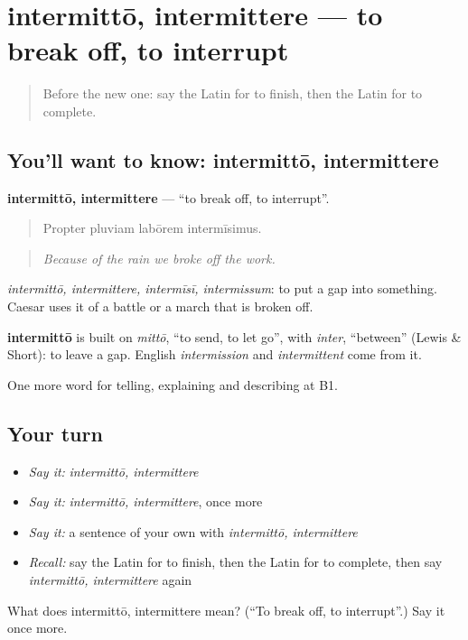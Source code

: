 \section[intermittō, intermittere]{intermittō, intermittere — to break off, to interrupt}

\label{lesson:LA-C297-intermitto}



\begin{quote}
Before the new one: say the Latin for to finish, then the Latin for to complete.
\end{quote}

\subsection*{You'll want to know: intermittō, intermittere}
\textbf{intermittō, intermittere} — \textquotedblleft{}to break off, to interrupt\textquotedblright{}.

\begin{quote}
Propter pluviam labōrem intermīsimus.
\end{quote}

\begin{quote}
\emph{Because of the rain we broke off the work.}
\end{quote}

\emph{intermittō, intermittere, intermīsī, intermissum}: to put a gap into something. Caesar uses it of a battle or a march that is broken off.

\begin{cousinweb}
\textbf{intermittō} is built on \emph{mittō}, \textquotedblleft{}to send, to let go\textquotedblright{}, with \emph{inter}, \textquotedblleft{}between\textquotedblright{} (Lewis \& Short): to leave a gap. English \emph{intermission} and \emph{intermittent} come from it.
\end{cousinweb}

\begin{grammarlens}[title={What you've built}]
One more word for telling, explaining and describing at B1.
\end{grammarlens}

\subsection*{Your turn}
\begin{itemize}
\raggedright
  \item \emph{Say it:} \emph{intermittō, intermittere}
  \item \emph{Say it:} \emph{intermittō, intermittere}, once more
  \item \emph{Say it:} a sentence of your own with \emph{intermittō, intermittere}
  \item \emph{Recall:} say the Latin for to finish, then the Latin for to complete, then say \emph{intermittō, intermittere} again
\end{itemize}

\begin{tcolorbox}[breakable,colback=teal!4,colframe=teal!35!black,title={Before you move on}]
What does intermittō, intermittere mean? (\textquotedblleft{}To break off, to interrupt\textquotedblright{}.) Say it once more.
\end{tcolorbox}
